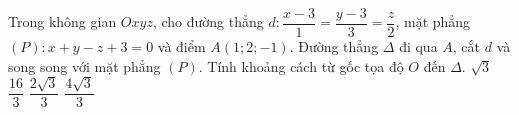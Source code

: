 \begin{ex}%
	Trong không gian $Oxyz$, cho đường thẳng $d\colon\dfrac{x-3}{1}=\dfrac{y-3}{3}=\dfrac{z}{2}$, mặt phẳng $(P)\colon x+y-z+3=0$ và điểm $A(1;2;-1)$. Đường thẳng $\Delta$ đi qua $A$, cắt $d$ và song song với mặt phẳng $\left(P\right)$. Tính khoảng cách từ gốc tọa độ $O$ đến $\Delta$.
\choice
{$\sqrt{3}$}
{$\dfrac{16}{3}$}
{$\dfrac{2\sqrt{3}}{3}$}
{\True $\dfrac{4\sqrt{3}}{3}$}
\end{ex}
